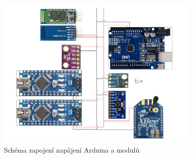 \begin{figure}[h]
	\centering
	\includegraphics[width=10cm]{pictures/pdb_ardu.pdf}
	\caption{Schéma zapojení napájení Arduina a modulů}
\end{figure}